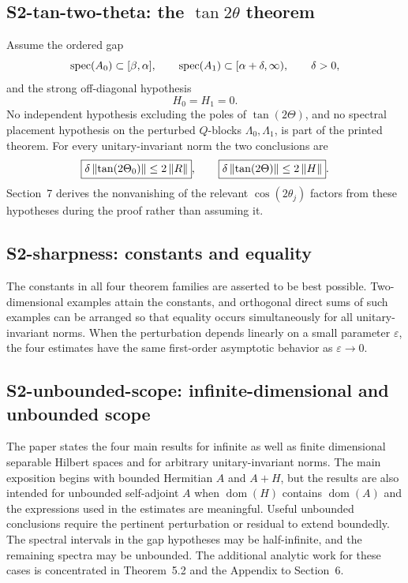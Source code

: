 \subsection*{S2-tan-two-theta: the $\tan 2\theta$ theorem}
Assume the ordered gap
\[
 \operatorname{spec}(A_0)\subset[\beta,\alpha],
 \qquad
 \operatorname{spec}(A_1)\subset[\alpha+\delta,\infty),
 \qquad \delta>0,
\]
and the strong off-diagonal hypothesis
\[
 H_0=H_1=0.
\]
No independent hypothesis excluding the poles of $\tan(2\Theta)$, and no spectral placement hypothesis on the perturbed $Q$-blocks $\Lambda_0,\Lambda_1$, is part of the printed theorem.  For every unitary-invariant norm the two conclusions are
\[
 \boxed{\delta\left\lVert \tan(2\Theta_0)\right\rVert\le2\left\lVert R\right\rVert},
 \qquad
 \boxed{\delta\left\lVert \tan(2\Theta)\right\rVert\le2\left\lVert H\right\rVert}.
\]
Section~7 derives the nonvanishing of the relevant $\cos(2\theta_j)$ factors from these hypotheses during the proof rather than assuming it.

\subsection*{S2-sharpness: constants and equality}
The constants in all four theorem families are asserted to be best possible.  Two-dimensional examples attain the constants, and orthogonal direct sums of such examples can be arranged so that equality occurs simultaneously for all unitary-invariant norms.  When the perturbation depends linearly on a small parameter $\varepsilon$, the four estimates have the same first-order asymptotic behavior as $\varepsilon\to0$.

\subsection*{S2-unbounded-scope: infinite-dimensional and unbounded scope}
The paper states the four main results for infinite as well as finite dimensional separable Hilbert spaces and for arbitrary unitary-invariant norms.  The main exposition begins with bounded Hermitian $A$ and $A+H$, but the results are also intended for unbounded self-adjoint $A$ when $\operatorname{dom}(H)$ contains $\operatorname{dom}(A)$ and the expressions used in the estimates are meaningful.  Useful unbounded conclusions require the pertinent perturbation or residual to extend boundedly.  The spectral intervals in the gap hypotheses may be half-infinite, and the remaining spectra may be unbounded.  The additional analytic work for these cases is concentrated in Theorem~5.2 and the Appendix to Section~6.

